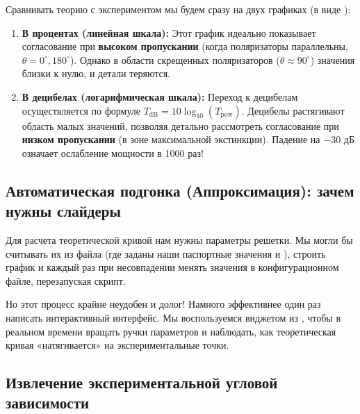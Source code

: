 Сравнивать теорию с экспериментом мы будем сразу на двух графиках (в виде ):
\begin{enumerate}
    \item \textbf{В процентах (линейная шкала):} Этот график идеально показывает согласование при \textbf{высоком пропускании} (когда поляризаторы параллельны, $\theta = 0^\circ, 180^\circ$). Однако в области скрещенных поляризаторов ($\theta \approx 90^\circ$) значения близки к нулю, и детали теряются.
    \item \textbf{В децибелах (логарифмическая шкала):} Переход к децибелам осуществляется по формуле $T_{\text{dB}} = 10 \log_{10}(T_{\text{pow}})$. Децибелы растягивают область малых значений, позволяя детально рассмотреть согласование при \textbf{низком пропускании} (в зоне максимальной экстинкции). Падение на $-30$ дБ означает ослабление мощности в 1000 раз!
\end{enumerate}

\subsection{Автоматическая подгонка (Аппроксимация): зачем нужны слайдеры}

Для расчета теоретической кривой нам нужны параметры решетки. Мы могли бы считывать их из файла  (где заданы наши паспортные значения  и ), строить график и каждый раз при несовпадении менять значения в конфигурационном файле, перезапуская скрипт.

Но этот процесс крайне неудобен и долог! Намного эффективнее один раз написать интерактивный интерфейс. Мы воспользуемся виджетом  из , чтобы в реальном времени вращать ручки параметров и наблюдать, как теоретическая кривая «натягивается» на экспериментальные точки.

\subsection{Извлечение экспериментальной угловой зависимости}

